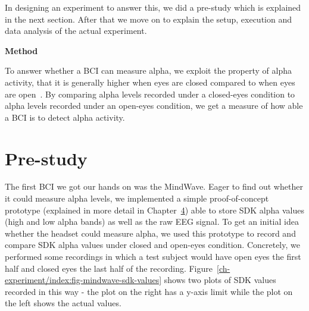 \documentclass[a4paper,10pt,english,lof,lot,twoside]{puthesis}
\begin{document}
In designing an experiment to answer this, we did a
pre-study which is explained in the next section. After that we move on to
explain the setup, execution and data analysis of the actual experiment.

\textbf{Method}

To answer whether a BCI can measure alpha, we exploit the property of alpha
activity, that it is generally higher when eyes are closed compared to when eyes
are open \cite{bazanova_comments_2012}.  By comparing alpha levels
recorded under a closed-eyes condition to alpha levels recorded under an
open-eyes condition, we get a measure of how able a BCI is to detect alpha
activity.


\section{Pre-study}
\label{ch-experiment/index:pre-study}\label{ch-experiment/index:ch-experiment-pre-study}
The first BCI we got our hands on was the MindWave. Eager to find out
whether it could measure alpha levels, we implemented a simple proof-of-concept
prototype (explained in more detail in Chapter {\hyperref[ch-design/index:ch-design]{4}}) able
to store SDK alpha values (high and low alpha bands) as well as the
raw EEG signal. To get an initial idea whether the headset could measure
alpha, we used this prototype to record and compare SDK alpha values under
closed and open-eyes condition. Concretely, we performed some recordings
in which a test subject would have open eyes the first half and closed
eyes the last half of the recording. Figure \ref{ch-experiment/index:fig-mindwave-sdk-values}
shows two plots of SDK values recorded in this way - the plot on the right
has a y-axis limit while the plot on the left
shows the actual values.
\end{document}
